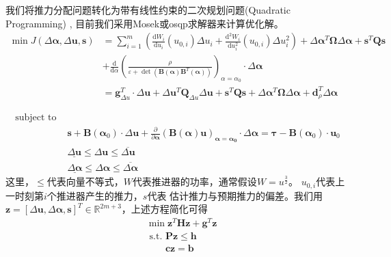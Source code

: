 我们将推力分配问题转化为带有线性约束的二次规划问题(Quadratic Programming)
\cite{johansen2004constrained}, 目前我们采用Mosek或osqp求解器来计算优化解。
\begin{equation}
  \label{eq:qpmin}
    \begin{aligned}
      \min J(\Delta \bm{\alpha}, \Delta \bm{u}, \bm{s})
      &= \sum_{i=1}^{m} \left(
      \frac{\mathrm{d} W_{i}}{\mathrm{d} u_{i}}\left( u_{0, i} \right)
      \Delta u_{i}+
      \frac{\mathrm{d}^{2} W_{i}}{\mathrm{d} u_{i}^{2}}\left(u_{0, i}\right)
      \Delta u_{i}^{2} \right)+
      \Delta \bm{\alpha}^{T} \bm{\Omega} \Delta \bm{\alpha}+\bm{s}^{T} \bm{Q} \bm{s} \\
      &+\frac{\mathrm{d}}{\mathrm{d}\alpha}\left(\frac{\rho}{\varepsilon+
      \operatorname{det}\left(\bm{B}(\bm{\alpha})\bm{B}^{T}(\bm{\alpha})\right)}\right)
      _{\alpha=\alpha_{0}} \cdot \Delta \bm{\alpha} \\
      &=\bm{g}_{\Delta u}^{T} \cdot \Delta \bm{u}+\Delta \bm{u}^{T} \bm{Q}_{\Delta u}
      \Delta \bm{u}+\bm{s}^{T} \bm{Q} \bm{s}+\Delta \bm{\alpha}^{T}
      \bm{\Omega} \Delta \bm{\alpha}+\bm{d}_{\rho}^{T} \Delta \bm{\alpha}
    \end{aligned}
\end{equation}

\begin{equation}
  \label{eq:qpconstraints}
    \begin{aligned}
      \text{subject to } \\
      &\bm{s}+\bm{B}\left(\bm{\alpha}_{0}\right) \cdot \Delta \bm{u}+
      \frac{\partial}{\partial \bm{\alpha}}(\bm{B}(\bm{\alpha}) \bm{u})
      _{\bm{\alpha}=\bm{\alpha_{0}}} \cdot \Delta \bm{\alpha}
      =\bm{\tau}-\bm{B}\left(\bm{\alpha}_{0}\right) \cdot \bm{u}_{0} \\
      &\underline{\Delta \bm{u}} \leq \Delta \bm{u} \leq \overline{\Delta \bm{u}}
      \\ &\underline{\Delta \bm{\alpha}} \leq \Delta \bm{\alpha} \leq \overline{\Delta \bm{\alpha}}
    \end{aligned}
\end{equation}
这里，$\leq$代表向量不等式，$W$代表推进器的功率，通常假设$W=u^{\frac{3}{2}}$。
 $u_{0,i}$代表上一时刻第$i$个推进器产生的推力，$s$代表
估计推力与预期推力的偏差。我们用$\bm{z}=[\Delta \bm{u}, \Delta \bm{\alpha},
\bm{s}]^T \in \mathbb{R}^{2m+3}$，上述方程简化可得
\begin{equation}
  \label{eq:qpsimple}
  \begin{aligned}
  & \min \bm{z}^{T} \bm{H} \bm{z}+\bm{g}^{T} \bm{z} \\
  &\text { s.t. }  \bm{P z} \leq \bm{h} \\
  &\qquad \bm{c z}=\bm{b}
  \end{aligned}
\end{equation}

